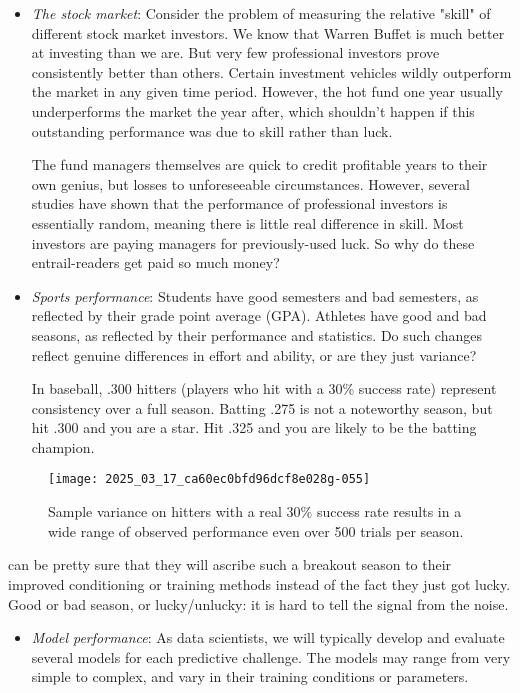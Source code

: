 \documentclass[10pt]{article}
\begin{document}
\begin{itemize}
  \item \textit{The stock market}: Consider the problem of measuring the relative "skill" of different stock market investors. We know that Warren Buffet is much better at investing than we are. But very few professional investors prove consistently better than others. Certain investment vehicles wildly outperform the market in any given time period. However, the hot fund one year usually underperforms the market the year after, which shouldn't happen if this outstanding performance was due to skill rather than luck.

The fund managers themselves are quick to credit profitable years to their own genius, but losses to unforeseeable circumstances. However, several studies have shown that the performance of professional investors is essentially random, meaning there is little real difference in skill. Most investors are paying managers for previously-used luck. So why do these entrail-readers get paid so much money?

  \item \textit{Sports performance}: Students have good semesters and bad semesters, as reflected by their grade point average (GPA). Athletes have good and bad seasons, as reflected by their performance and statistics. Do such changes reflect genuine differences in effort and ability, or are they just variance?

In baseball, .300 hitters (players who hit with a 30\% success rate) represent consistency over a full season. Batting .275 is not a noteworthy season, but hit .300 and you are a star. Hit .325 and you are likely to be the batting champion.
\end{itemize}

\begin{figure}[h!]
  \centering
  \texttt{[image: 2025\_03\_17\_ca60ec0bfd96dcf8e028g-055]}
  \caption{Sample variance on hitters with a real 30\% success rate results in a wide range of observed performance even over 500 trials per season.}
\end{figure}

can be pretty sure that they will ascribe such a breakout season to their improved conditioning or training methods instead of the fact they just got lucky. Good or bad season, or lucky/unlucky: it is hard to tell the signal from the noise.

\begin{itemize}
  \item \textit{Model performance}: As data scientists, we will typically develop and evaluate several models for each predictive challenge. The models may range from very simple to complex, and vary in their training conditions or parameters.
\end{itemize}
\end{document}
